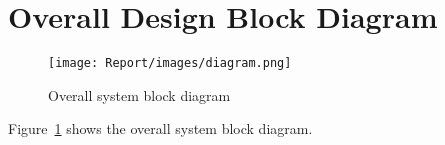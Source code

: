\section{Overall Design Block Diagram}

\vspace{0.6cm}
\begin{figure}[!htb]
    \centering
    \texttt{[image: Report/images/diagram.png]}
    \caption{Overall system block diagram}
    \label{fig:overallDesign}
\end{figure}

Figure~\ref{fig:overallDesign} shows the overall system block diagram.
